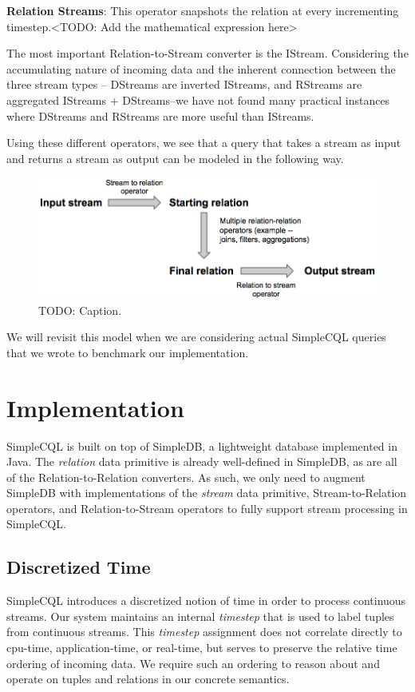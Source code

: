 \documentclass[a4paper, 10pt, conference]{IEEEconf}
\begin{document}
\textbf{Relation Streams}: This operator snapshots the relation at every incrementing timestep.<TODO: Add the mathematical expression here>

The most important Relation-to-Stream converter is the IStream. Considering the accumulating nature of incoming data and the inherent connection between the three stream types -- DStreams are inverted IStreams, and RStreams are aggregated IStreams + DStreams--we have not found many practical instances where DStreams and RStreams are more useful than IStreams.

Using these different operators, we see that a query that takes a stream as input and returns a stream as output can be modeled in the following way.

\begin{figure}[tpH]
    \centering
    \centerline{\includegraphics[totalheight=2.5cm]{operators.png}}
    \caption{TODO: Caption.}
    \label{fig:operators}
\end{figure}

We will revisit this model when we are considering actual SimpleCQL queries that we wrote to benchmark our implementation.


\section{Implementation}
SimpleCQL is built on top of SimpleDB, a lightweight database implemented in Java. The \textit{relation} data primitive is already well-defined in SimpleDB, as are all of the Relation-to-Relation converters. As such, we only need to augment SimpleDB with implementations of the \textit{stream} data primitive, Stream-to-Relation operators, and Relation-to-Stream operators to fully support stream processing in SimpleCQL. 

\subsection{Discretized Time}
SimpleCQL introduces a discretized notion of time in order to process continuous streams. Our system maintains an internal \textit{timestep} that is used to label tuples from continuous streams. This \textit{timestep} assignment does not correlate directly to cpu-time, application-time, or real-time, but serves to preserve the relative time ordering of incoming data. We require such an ordering to reason about and operate on tuples and relations in our concrete semantics.
\end{document}
